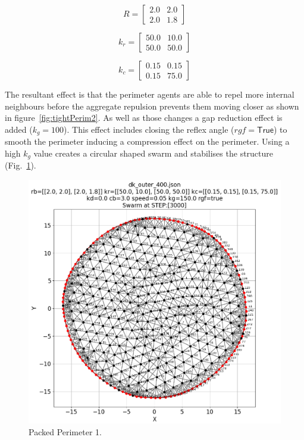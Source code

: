 \documentclass[12pt,a4paper]{IEEEtran}
\newcommand{\kc}{\mathit{k_{c}}}
\newcommand{\kr}{\mathit{k_{r}}}
\newcommand{\kg}{\mathit{k_{g}}}
\newcommand{\rb}{\mathit{R}}
\newcommand{\rgf}{\mathit{rgf}}
\begin{document}
\begin{equation}\label{eq:rbexp1}
\rb = 
\begin{bmatrix}
2.0 & 2.0\\
2.0 & 1.8
\end{bmatrix}
\end{equation}

\begin{equation}\label{eq:krexp1}
\kr = 
\begin{bmatrix}
50.0 & 10.0\\
50.0 & 50.0
\end{bmatrix}
\end{equation}

\begin{equation}\label{eq:kcexp1}
\kc = 
\begin{bmatrix}
0.15 & 0.15\\
0.15 & 75.0
\end{bmatrix}
\end{equation}

The resultant effect is that the perimeter agents are able to repel more internal neighbours before the aggregate repulsion prevents them moving closer as shown in figure~\ref{fig:tightPerim2}. As well as those changes a gap reduction effect is added ($\kg=100$). This effect includes closing the reflex angle ($\rgf=\mathsf{True}$) to smooth the perimeter inducing a compression effect on the perimeter. Using a high $\kg$ value creates a circular shaped swarm and stabilises the structure (Fig.~\ref{fig:tightPerim}).

\begin{figure}[H]
	\begin{center}
		\includegraphics[width=1.0\linewidth]{figures/outer1}
	\end{center}
	\caption{Packed Perimeter 1. \label{fig:tightPerim}}
\end{figure}
\end{document}
